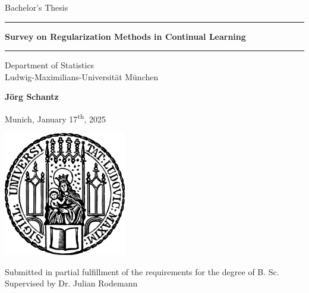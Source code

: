 \documentclass[12pt]{article}
\newcommand{\mytitle}{Survey on Regularization Methods in Continual Learning}
\newcommand{\myname}{Jörg Schantz}
\newcommand{\mysupervisor}{Dr. Julian Rodemann}
\begin{document}
	
	
	\begin{titlepage}
		\begin{center}
			
			\LARGE
			Bachelor's Thesis
			
			\vspace{0.5cm}
			
			\rule{\textwidth}{1.5pt}
			\LARGE
			\textbf{\mytitle}
			\rule{\textwidth}{1.5pt}
			
			\vspace{0.5cm}
			
			\large
			Department of Statistics \\
			Ludwig-Maximilians-Universität München 
			
			\vfill
			
			\Large
			\textbf{\myname}
			
			\vfill
			
			\large
			Munich, January 17\textsuperscript{th}, 2025
			
			\vfill
			
			\includegraphics[width = 0.4\textwidth]{img/sigillum.png}
			
			\vfill
			
			\normalsize
			Submitted in partial fulfillment of the requirements for the degree of B. Sc.
			\\
			
			Supervised by \mysupervisor
			
		\end{center}
	\end{titlepage}
	
	
	\newpage
	
	\begin{abstract}
		
		Lorem ipsum dolor sit amet, consectetur adipiscing elit, sed do eiusmod tempor 
		incididunt ut labore et dolore magna aliqua. Ut enim ad minim veniam, quis 
		nostrud exercitation ullamco laboris nisi ut aliquip ex ea commodo consequat. 
		Duis aute irure dolor in reprehenderit in voluptate velit esse cillum dolore eu 
		fugiat nulla pariatur. Excepteur sint occaecat cupidatat non proident, sunt in 
		culpa qui officia deserunt mollit anim id est laborum. \cite{SB}
		
	\end{abstract}
	
\end{document}
